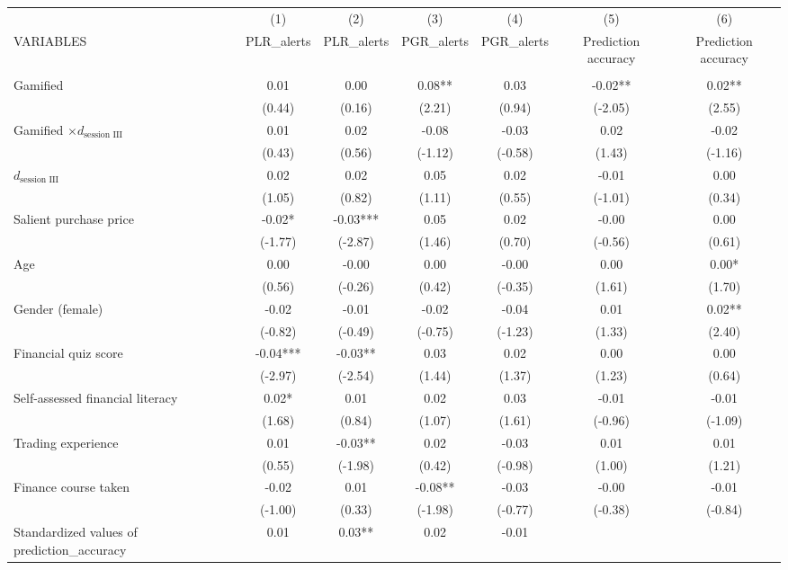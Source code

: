 \documentclass[]{article}
\begin{document}
\begin{tabular}{lcccccc} \hline
 & (1) & (2) & (3) & (4) & (5) & (6) \\
VARIABLES & PLR\_alerts & PLR\_alerts & PGR\_alerts & PGR\_alerts & Prediction accuracy & Prediction accuracy \\ \hline
 &  &  &  &  &  &  \\
Gamified & 0.01 & 0.00 & 0.08** & 0.03 & -0.02** & 0.02** \\
 & (0.44) & (0.16) & (2.21) & (0.94) & (-2.05) & (2.55) \\
Gamified $\times d_\text{session III}$ & 0.01 & 0.02 & -0.08 & -0.03 & 0.02 & -0.02 \\
 & (0.43) & (0.56) & (-1.12) & (-0.58) & (1.43) & (-1.16) \\
$ d_\text{session III}$ & 0.02 & 0.02 & 0.05 & 0.02 & -0.01 & 0.00 \\
 & (1.05) & (0.82) & (1.11) & (0.55) & (-1.01) & (0.34) \\
Salient purchase price & -0.02* & -0.03*** & 0.05 & 0.02 & -0.00 & 0.00 \\
 & (-1.77) & (-2.87) & (1.46) & (0.70) & (-0.56) & (0.61) \\
Age & 0.00 & -0.00 & 0.00 & -0.00 & 0.00 & 0.00* \\
 & (0.56) & (-0.26) & (0.42) & (-0.35) & (1.61) & (1.70) \\
Gender (female) & -0.02 & -0.01 & -0.02 & -0.04 & 0.01 & 0.02** \\
 & (-0.82) & (-0.49) & (-0.75) & (-1.23) & (1.33) & (2.40) \\
Financial quiz score & -0.04*** & -0.03** & 0.03 & 0.02 & 0.00 & 0.00 \\
 & (-2.97) & (-2.54) & (1.44) & (1.37) & (1.23) & (0.64) \\
Self-assessed financial literacy & 0.02* & 0.01 & 0.02 & 0.03 & -0.01 & -0.01 \\
 & (1.68) & (0.84) & (1.07) & (1.61) & (-0.96) & (-1.09) \\
Trading experience & 0.01 & -0.03** & 0.02 & -0.03 & 0.01 & 0.01 \\
 & (0.55) & (-1.98) & (0.42) & (-0.98) & (1.00) & (1.21) \\
Finance course taken & -0.02 & 0.01 & -0.08** & -0.03 & -0.00 & -0.01 \\
 & (-1.00) & (0.33) & (-1.98) & (-0.77) & (-0.38) & (-0.84) \\
Standardized values of prediction\_accuracy & 0.01 & 0.03** & 0.02 & -0.01 &  &  \\

\end{tabular}
\end{document}
